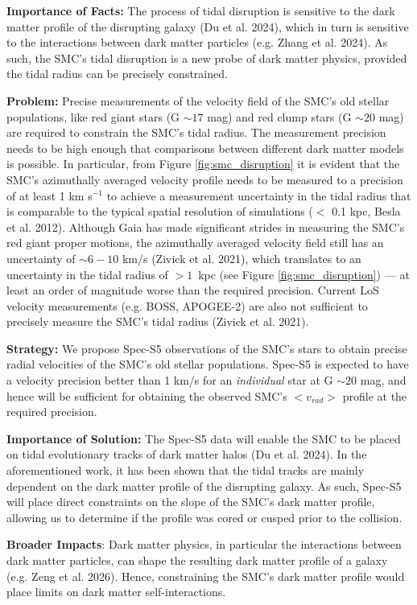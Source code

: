 \textbf{Importance of Facts:} The process of tidal disruption is sensitive to the dark matter profile of the disrupting galaxy (Du et al. 2024), which in turn is sensitive to the interactions between dark matter particles (e.g. Zhang et al. 2024). As such, the SMC's tidal disruption is a new probe of dark matter physics, provided the tidal radius can be precisely constrained.

\textbf{Problem:} Precise measurements of the velocity field of the SMC's old stellar populations, like red giant stars (G $\sim 17$ mag) and red clump stars (G $\sim 20$ mag) are required to constrain the SMC's tidal radius. The measurement precision needs to be high enough that comparisons between different dark matter models is possible. In particular, from Figure \ref{fig:smc_disruption} it is evident that the SMC's azimuthally averaged velocity profile needs to be measured to a precision of at least 1 km s$^{-1}$ to achieve a measurement uncertainty in the tidal radius that is comparable to the typical spatial resolution of simulations ($<$ 0.1 kpc, Besla et al. 2012). Although Gaia has made significant strides in measuring the SMC's red giant proper motions, the azimuthally averaged velocity field still has an uncertainty of $\sim 6-10$ km/s (Zivick et al. 2021), which translates to an uncertainty in the tidal radius of $>1$~kpc (see Figure \ref{fig:smc_disruption}) --- at least an order of magnitude worse than the required precision. Current LoS velocity measurements (e.g. BOSS, APOGEE-2) are also not sufficient to precisely measure the SMC's tidal radius (Zivick et al. 2021).

\textbf{Strategy:} We propose Spec-S5 observations of the SMC's stars to obtain precise radial velocities of the SMC's old stellar populations. Spec-S5 is expected to have a velocity precision better than 1 km/s for an {\em individual} star at G $\sim 20$ mag, and hence will be sufficient for obtaining the observed SMC's $<v_{rad}>$ profile at the required precision.

\textbf{Importance of Solution:} The Spec-S5 data will enable the SMC to be placed on tidal evolutionary tracks of dark matter halos (Du et al. 2024). In the aforementioned work, it has been shown that the tidal tracks are mainly dependent on the dark matter profile of the disrupting galaxy. As such, Spec-S5 will place direct constraints on the slope of the SMC's dark matter profile, allowing us to determine if the profile was cored or cusped prior to the collision.

\textbf{Broader Impacts}:  Dark matter physics, in particular the interactions between dark matter particles, can shape the resulting dark matter profile of a galaxy (e.g. Zeng et al. 2026). Hence, constraining the SMC's dark matter profile would place limits on dark matter self-interactions.
